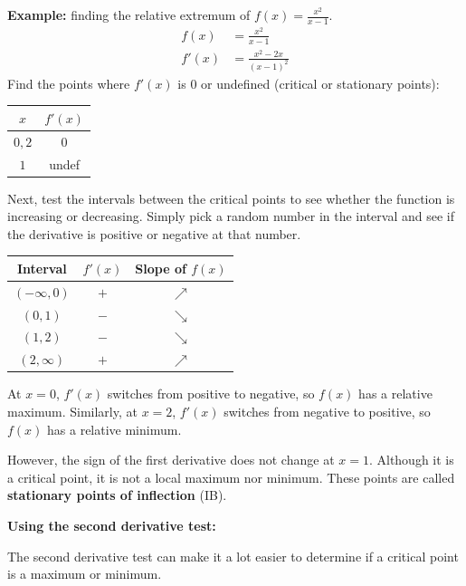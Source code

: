 \documentclass[12pt]{article}
\begin{document}
\noindent \textbf{Example:} finding the relative extremum of $f(x) = \frac{x^2}{x-1}$.
\begin{align*}
    f(x)  & = \frac{x^2}{x-1}        \\[6pt]
    f'(x) & = \frac{x^2-2x}{(x-1)^2}
\end{align*}
Find the points where $f'(x)$ is $0$ or undefined (critical or stationary points):
\begin{center}
    \begin{tabular}{|c|c|}
        \hline
        $x$    & $f'(x)$ \\
        \hline \hline
        $0, 2$ & $0$     \\
        \hline
        $1$    & undef   \\
        \hline
    \end{tabular}
\end{center}

Next, test the intervals between the critical points to see whether the function is increasing or decreasing. Simply pick a random number in the interval and see if the derivative is positive or negative at that number.
\begin{center}
    \begin{tabular}{|c|c|c|}
        \hline
        Interval       & $f'(x)$ & Slope of $f(x)$ \\
        \hline \hline
        $(-\infty, 0)$ & $+$     & $\nearrow$      \\
        \hline
        $(0, 1)$       & $-$     & $\searrow$      \\
        \hline
        $(1, 2)$       & $-$     & $\searrow$      \\
        \hline
        $(2, \infty)$  & $+$     & $\nearrow$      \\
        \hline
    \end{tabular}
\end{center}

At $x=0$, $f'(x)$ switches from positive to negative, so $f(x)$ has a relative maximum. Similarly, at $x=2$, $f'(x)$ switches from negative to positive, so $f(x)$ has a relative minimum.

However, the sign of the first derivative does not change at $x=1$. Although it is a critical point, it is not a local maximum nor minimum. These points are called \textbf{stationary points of inflection} (IB).

\noindent \textbf{Using the second derivative test:}

The second derivative test can make it a lot easier to determine if a critical point is a maximum or minimum.
\end{document}
